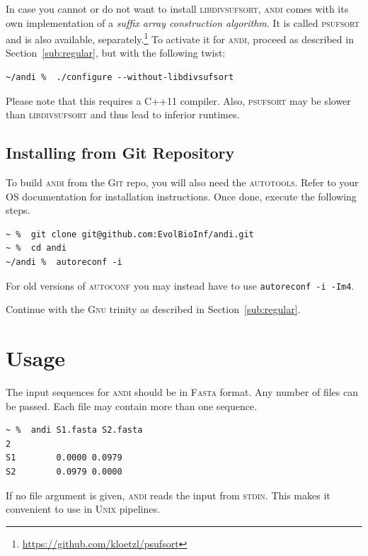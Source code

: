 \documentclass[a4paper,
  10pt,
  english,
  DIV=12,
  BCOR=8mm]{scrbook}
\newcommand{\algo}[1]{\textsc{{#1}}}
\newcommand{\andi}{\algo{andi} }
\begin{document}
In case you cannot or do not want to install \algo{libdivsufsort}, \andi comes with its own implementation of a \emph{suffix array construction algorithm}. It is called \algo{psufsort} and is also available, separately.\footnote{\url{https://github.com/kloetzl/psufsort}} To activate it for \algo{andi}, proceed as described in Section~\ref{sub:regular}, but with the following twist:

\begin{lstlisting}
~/andi %  ./configure --without-libdivsufsort
\end{lstlisting}

Please note that this requires a C++11 compiler. Also, \algo{psufsort} may be slower than \algo{libdivsufsort} and thus lead to inferior runtimes.

\section{Installing from Git Repository}

To build \andi from the \algo{Git} repo, you will also need the \algo{autotools}. Refer to your OS documentation for installation instructions. Once done, execute the following steps.

\begin{lstlisting}
~ %  git clone git@github.com:EvolBioInf/andi.git
~ %  cd andi
~/andi %  autoreconf -i
\end{lstlisting}

\noindent For old versions of \algo{autoconf} you may instead have to use \lstinline$autoreconf -i -Im4$.

\noindent Continue with the \algo{Gnu} trinity as described in Section~\ref{sub:regular}.


\chapter{Usage} %

The input sequences for \andi should be in \algo{Fasta} format. Any number of files can be passed. Each file may contain more than one sequence.

\begin{lstlisting}
~ %  andi S1.fasta S2.fasta
2
S1        0.0000 0.0979
S2        0.0979 0.0000
\end{lstlisting}

If no file argument is given, \andi reads the input from \algo{stdin}. This makes it convenient to use in \algo{Unix} pipelines.
\end{document}
